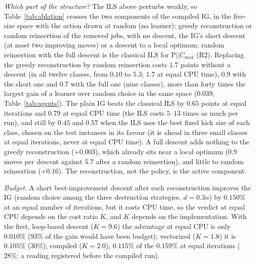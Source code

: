 \documentclass[conference,a4paper]{IEEEtran}
\newcommand{\Cmax}{C_{\max}}
\begin{document}
\emph{Which part of the structure?} The ILS above perturbs weakly, so Table~\ref{tab:ablation} crosses the two components of the compiled IG, in the five-size space with the action drawn at random (no learner): greedy reconstruction or random reinsertion of the removed jobs, with no descent, the IG's short descent (at most two improving moves) or a descent to a local optimum; random reinsertion with the full descent is the classical ILS for P$||\Cmax$ (R2).
Replacing the greedy reconstruction by random reinsertion costs $1.7$ points without a descent (in all twelve classes, from $0.10$ to $5.3$; $1.7$ at equal CPU time), $0.9$ with the short one and $0.7$ with the full one (nine classes), more than forty times the largest gain of a learner over random choice in the same space ($0.039$, Table~\ref{tab:agents}).
The plain IG beats the classical ILS by $0.65$ points at equal iterations and $0.79$ at equal CPU time (the ILS costs $5$--$13$ times as much per run), and still by $0.45$ and $0.57$ when the ILS uses the best fixed kick size of each class, chosen on the test instances in its favour (it is ahead in three small classes at equal iterations, never at equal CPU time).
A full descent adds nothing to the greedy reconstruction ($+0.003$), which already sits near a local optimum ($0.9$ moves per descent against $5.7$ after a random reinsertion), and little to random reinsertion ($+0.16$). The reconstruction, not the policy, is the active component.



\emph{Budget.} A short best-improvement descent after each reconstruction improves the IG (random choice among the three destruction strategies, $d=0.3n$) by $0.150\%$ at an equal number of iterations, but it costs CPU time, so the verdict at equal CPU depends on the cost ratio $K$, and $K$ depends on the implementation.
With the first, loop-based descent ($K=9.6$) the advantage at equal CPU is only $0.010\%$ ($93\%$ of the gain would have been budget); vectorized ($K=1.8$) it is $0.105\%$ ($30\%$); compiled ($K=2.0$), $0.115\%$ of the $0.159\%$ at equal iterations ($28\%$; a reading registered before the compiled run).
\end{document}
